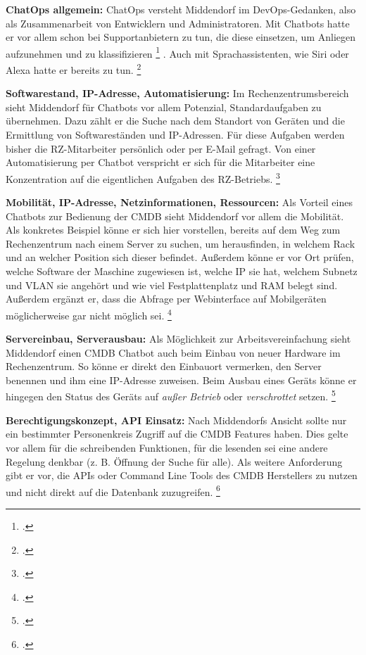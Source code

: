 \textbf{ChatOps allgemein: }ChatOps versteht Middendorf im DevOps-Gedanken, also als Zusammenarbeit von Entwicklern und Administratoren.
Mit Chatbots hatte er vor allem schon bei Supportanbietern zu tun, die diese einsetzen, um \glqq{}Anliegen aufzunehmen und zu klassifizieren\grqq
\footcite[][o. \pno]{Midd_2019}
.
Auch mit Sprachassistenten, wie Siri oder Alexa hatte er bereits zu tun.
\footcite[Vgl.][o. \pno]{Midd_2019}

\textbf{Softwarestand, IP-Adresse, Automatisierung: }Im Rechenzentrumsbereich sieht Middendorf für Chatbots vor allem Potenzial, Standardaufgaben zu übernehmen. Dazu zählt er die Suche nach dem Standort von Geräten und die Ermittlung von Softwareständen und IP-Adressen. Für diese Aufgaben werden bisher die RZ-Mitarbeiter persönlich oder per E-Mail gefragt. Von einer Automatisierung per Chatbot verspricht er sich für die Mitarbeiter eine Konzentration auf die eigentlichen Aufgaben des RZ-Betriebs.
\footcite[Vgl.][o. \pno]{Midd_2019}

\textbf{Mobilität, IP-Adresse, Netzinformationen, Ressourcen: }Als Vorteil eines Chatbots zur Bedienung der \acs{CMDB} sieht Middendorf vor allem die Mobilität. Als konkretes Beispiel könne er sich hier vorstellen, bereits auf dem Weg zum Rechenzentrum nach einem Server zu suchen, um herausfinden, in welchem Rack und an welcher Position sich dieser befindet. Außerdem könne er vor Ort prüfen, welche Software der Maschine zugewiesen ist, welche IP sie hat, welchem Subnetz und VLAN sie angehört und wie viel Festplattenplatz und RAM belegt sind.
Außerdem ergänzt er, dass die Abfrage per Webinterface auf Mobilgeräten möglicherweise gar nicht möglich sei.
\footcite[Vgl.][o. \pno]{Midd_2019}

\textbf{Servereinbau, Serverausbau: }Als Möglichkeit zur Arbeitsvereinfachung sieht Middendorf einen \acs{CMDB} Chatbot auch beim Einbau von neuer Hardware im Rechenzentrum. So könne er direkt den Einbauort vermerken, den Server benennen und ihm eine IP-Adresse zuweisen. Beim Ausbau eines Geräts könne er hingegen den Status des Geräts auf \textit{außer Betrieb} oder \textit{verschrottet} setzen.
\footcite[Vgl.][o. \pno]{Midd_2019}

\textbf{Berechtigungskonzept, API Einsatz: }Nach Middendorfs Ansicht sollte nur ein bestimmter Personenkreis Zugriff auf die \acs{CMDB} Features haben. Dies gelte vor allem für die schreibenden Funktionen, für die lesenden sei eine andere Regelung denkbar (z. B. Öffnung der Suche für alle).
Als weitere Anforderung gibt er vor, die \acsp{API} oder Command Line Tools des \acs{CMDB} Herstellers zu nutzen und nicht direkt auf die Datenbank zuzugreifen.
\footcite[Vgl.][o. \pno]{Midd_2019}

